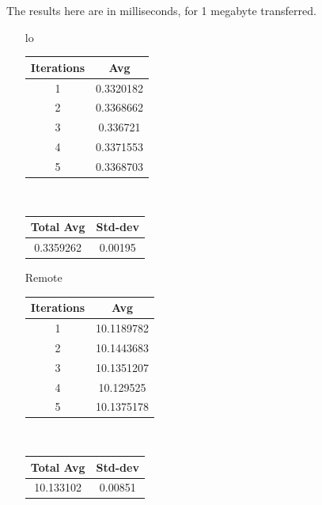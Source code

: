 The results here are in milliseconds, for 1 megabyte transferred.

\begin{enumerate}
    \item [lo]
        \begin{center}
            \begin{tabular}{||c c||} 
                 \hline
                 Iterations & Avg \\ [0.5ex] 
                 \hline\hline
                 1 & 0.3320182  \\ 
                 \hline
                 2 & 0.3368662  \\ 
                 \hline
                 3 & 0.336721 \\ 
                 \hline
                 4 & 0.3371553 \\ 
                 \hline
                 5 & 0.3368703   \\ 
                 \hline
                 \hline
                \end{tabular} \\
                \begin{tabular}{||c c||} 
                 \hline
                 Total Avg & Std-dev \\ [0.5ex] 
                 \hline\hline
                 0.3359262 & 0.00195 \\ 
                 \hline
                \hline
            \end{tabular}
        \end{center}
    \item [Remote]
         \begin{center}
            \begin{tabular}{||c c||} 
             \hline
             Iterations & Avg \\ [0.5ex] 
             \hline\hline
             1 & 10.1189782  \\ 
             \hline
             2 & 10.1443683  \\ 
             \hline
             3 & 10.1351207  \\ 
             \hline
             4 & 10.129525 \\ 
             \hline
             5 & 10.1375178 \\ 
             \hline
             \hline
            \end{tabular} \\
            \begin{tabular}{||c c||} 
             \hline
             Total Avg & Std-dev \\ [0.5ex] 
             \hline\hline
             10.133102 & 0.00851 \\ 
             \hline
             \hline
            \end{tabular}
        \end{center}
\end{enumerate}

